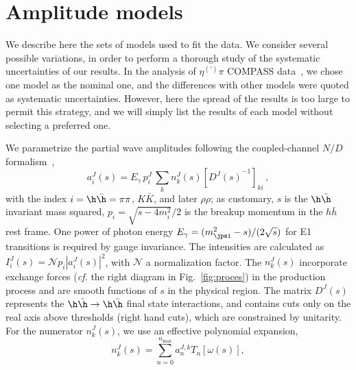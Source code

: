 \section{Amplitude models}
\label{sec:model}
We describe here the sets of models used to fit the data. We consider several possible variations, in order to perform a thorough study of the systematic uncertainties of our results. In the analysis of $\eta^{(\prime)}\pi$ COMPASS data~\cite{JPAC:2018zyd}, we chose one model as the nominal one, and the differences with other models were quoted as systematic uncertainties. However, here the spread of the results is too large to permit this strategy, and we will simply list the results of each model without selecting a preferred one. 



We parametrize the partial wave amplitudes following the coupled-channel $N/D$
formalism~\cite{Chew:1960iv,Bjorken:1960zz,Aitchison:1972ay,Oller:1998hw},
\begin{equation}
\label{eq:amplitude}
 a^J_i(s) = E_\gamma\, p_i^{J} \, \sum_k n^J_k(s) \left[ {D^J(s)}^{-1} \right]_{ki}\,,
\end{equation}
with the index $i=\h\bar \h=\pi\pi$, $K\bar K$, and later $\rho\rho$; as customary, $s$ is the $\h\bar \h$ invariant mass squared, 
$p_i=\sqrt{s- 4m_{i}^2}/2$
is the breakup momentum in the $h\bar h$ rest frame. One power of photon energy
$E_\gamma=(m_{\jpsi}^2-s)/(2\sqrt{s})$ for E1 transitions is required by gauge invariance. The intensities are calculated as $I^J_i(s) = \mathcal{N} p_i \left|a^J_i(s)\right|^2$, with $\mathcal{N}$ a normalization factor. The $n^J_k(s)$ incorporate exchange forces ({\it cf.} the right diagram in 
  Fig.~\ref{fig:proces}) 
     in the production process
and are smooth functions of $s$ in the physical region. The matrix 
$D^J(s)$  represents the $\h \bar \h \to \h \bar \h$ final state
interactions, and contains cuts only on the real axis above
thresholds (right hand cuts), which are constrained by
unitarity. For the numerator $n^J_k(s)$, we use an effective polynomial expansion,
\begin{equation}
    n^J_k(s)=\sum_{n=0}^{n_\text{max}}{a^{J,k}_n  T_n\left[\omega(s)\right]},
    \label{eq:production}
\end{equation}

